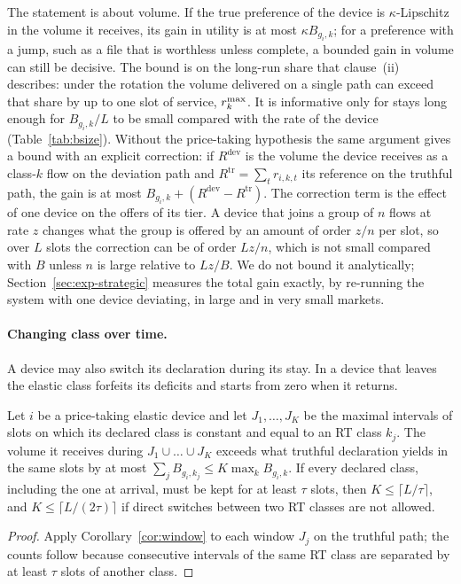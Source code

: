 The statement is about volume. If the true preference of the device is $\kappa$-Lipschitz in the volume it receives, its gain in utility is at most $\kappa B_{g_i,k}$; for a preference with a jump, such as a file that is worthless unless complete, a bounded gain in volume can still be decisive.
The bound is on the long-run share that clause~(ii) describes: under the rotation the volume delivered on a single path can exceed that share by up to one slot of service, $r^{\max}_k$.
It is informative only for stays long enough for $B_{g_i,k}/L$ to be small compared with the rate of the device (Table~\ref{tab:bsize}).
Without the price-taking hypothesis the same argument gives a bound with an explicit correction: if $R^{\mathrm{dev}}$ is the volume the device receives as a class-$k$ flow on the deviation path and $R^{\mathrm{tr}}=\sum_tr_{i,k,t}$ its reference on the truthful path, the gain is at most $B_{g_i,k}+(R^{\mathrm{dev}}-R^{\mathrm{tr}})$.
The correction term is the effect of one device on the offers of its tier. A device that joins a group of $n$ flows at rate $z$ changes what the group is offered by an amount of order $z/n$ per slot, so over $L$ slots the correction can be of order $Lz/n$, which is not small compared with $B$ unless $n$ is large relative to $Lz/B$. We do not bound it analytically; Section~\ref{sec:exp-strategic} measures the total gain exactly, by re-running the system with one device deviating, in large and in very small markets.

\paragraph{Changing class over time.}
A device may also switch its declaration during its stay.
In \repay{} a device that leaves the elastic class forfeits its deficits and starts from zero when it returns.

\begin{theorem}\label{thm:dynamic}
Let $i$ be a price-taking elastic device and let $J_1,\dots,J_K$ be the maximal intervals of slots on which its declared class is constant and equal to an RT class $k_j$.
The volume it receives during $J_1\cup\dots\cup J_K$ exceeds what truthful declaration yields in the same slots by at most $\sum_{j}B_{g_i,k_j}\le K\max_kB_{g_i,k}$.
If every declared class, including the one at arrival, must be kept for at least $\tau$ slots, then $K\le\lceil L/\tau\rceil$, and $K\le\lceil L/(2\tau)\rceil$ if direct switches between two RT classes are not allowed.
\end{theorem}
\begin{proof}
Apply Corollary~\ref{cor:window} to each window $J_j$ on the truthful path; the counts follow because consecutive intervals of the same RT class are separated by at least $\tau$ slots of another class.
\end{proof}

